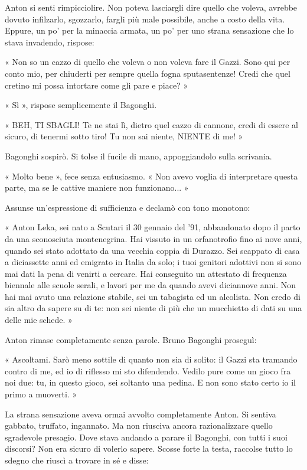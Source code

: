 Anton si senti rimpicciolire. Non poteva lasciargli dire quello che voleva, avrebbe dovuto infilzarlo, sgozzarlo, fargli più male possibile, anche a costo della vita. Eppure, un po' per la minaccia armata, un po' per uno strana sensazione che lo stava invadendo, rispose:

« Non so un cazzo di quello che voleva o non voleva fare il Gazzi. Sono qui per conto mio, per chiuderti per sempre quella fogna sputasentenze! Credi che quel cretino mi possa intortare come gli pare e piace? »

« Sì », rispose semplicemente il Bagonghi.

« BEH, TI SBAGLI! Te ne stai lì, dietro quel cazzo di cannone, credi di essere al sicuro, di tenermi sotto tiro! Tu non sai niente, NIENTE di me! »

Bagonghi sospirò. Si tolse il fucile di mano, appoggiandolo sulla scrivania.

« Molto bene », fece senza entusiasmo. « Non avevo voglia di interpretare questa parte, ma se le cattive maniere non funzionano... »

Assunse un'espressione di sufficienza e declamò con tono monotono:

« Anton Leka, sei nato a Scutari il 30 gennaio del '91, abbandonato dopo il parto da una sconosciuta montenegrina. Hai vissuto in un orfanotrofio fino ai nove anni, quando sei stato adottato da una vecchia coppia di Durazzo. Sei scappato di casa a diciassette anni ed emigrato in Italia da solo; i tuoi genitori adottivi non si sono mai dati la pena di venirti a cercare. Hai conseguito un attestato di frequenza biennale alle scuole serali, e lavori per me da quando avevi diciannove anni. Non hai mai avuto una relazione stabile, sei un tabagista ed un alcolista. Non credo di sia altro da sapere su di te: non sei niente di più che un mucchietto di dati su una delle mie schede. »

Anton rimase completamente senza parole. Bruno Bagonghi proseguì:

« Ascoltami. Sarò meno sottile di quanto non sia di solito: il Gazzi sta tramando contro di me, ed io di riflesso mi sto difendendo. Vedilo pure come un gioco fra noi due: tu, in questo gioco, sei soltanto una pedina. E non sono stato certo io il primo a muoverti. »

La strana sensazione aveva ormai avvolto completamente Anton. Si sentiva gabbato, truffato, ingannato. Ma non riusciva ancora razionalizzare quello sgradevole presagio. Dove stava andando a parare il Bagonghi, con tutti i suoi discorsi? Non era sicuro di volerlo sapere. Scosse forte la testa, raccolse tutto lo sdegno che riuscì a trovare in sé e disse:

